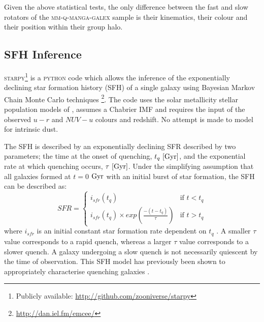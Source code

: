 \documentclass[useAMS,usenatbib]{mn2e}
\begin{document}
Given the above statistical tests, the only difference between the fast and slow rotators of the \textsc{mm-q-manga-galex} sample is their kinematics, their colour and their position within their group halo.


\subsection{SFH Inference}\label{sec:starpy}

\textsc{starpy}\footnote{Publicly available: \url{http://github.com/zooniverse/starpy}} is a \textsc{python} code which allows the inference of the exponentially declining star formation history (SFH) of a single galaxy using  Bayesian Markov Chain Monte Carlo techniques \citep{emcee13}\footnote{\url{http://dan.iel.fm/emcee/}}. The code uses the solar metallicity stellar population models of \cite[][hereafter BC03]{BC03}, assumes a Chabrier IMF \citep{chabrier03} and requires the input of the observed $u-r$ and $NUV-u$ colours and redshift. No attempt is made to model for intrinsic dust. 

The SFH is described by an exponentially declining SFR described by two parameters; the time at the onset of quenching, $t_q~\rm{[Gyr]}$, and the exponential rate at which quenching occurs, $\tau~\rm{[Gyr]}$. Under the simplifying assumption that all galaxies formed at $t=0$ $\rm{ Gyr}$ with an initial burst of star formation, the SFH can be described as:
\begin{equation}\label{sfh}
SFR =
\begin{cases}
i_{sfr}(t_q) & \text{if } t < t_q \\
i_{sfr}(t_q) \times exp{\left( \frac{-(t-t_{q})}{\tau}\right)} & \text{if } t > t_q 
\end{cases}
\end{equation}
where $i_{sfr}$ is an initial constant star formation rate dependent on $t_q$ \citep{schawinski14, smethurst15}.  A smaller $\tau$ value corresponds to a rapid quench, whereas a larger $\tau$ value corresponds to a slower quench. A galaxy undergoing a slow quench is not necessarily quiescent by the time of observation. This SFH model has previously been shown to appropriately characterise quenching galaxies \citep{Weiner06, Martin07, Noeske07,schawinski14}. 
\end{document}
